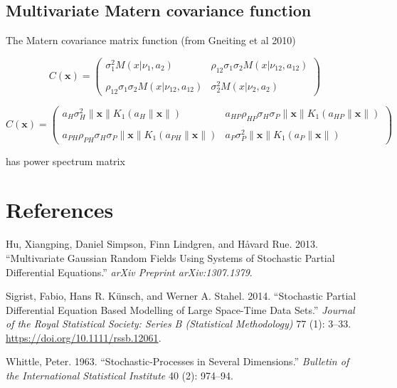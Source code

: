 \documentclass{article}
\begin{document}
\hypertarget{multivariate-matern-covariance-function}{%
\subsection{Multivariate Matern covariance
function}\label{multivariate-matern-covariance-function}}

The Matern covariance matrix function (from Gneiting et al 2010)

\[C(\pmb x)=\left(\begin{matrix}
  \sigma_1^2M(x|\nu_1,a_2) & \rho_{12}\sigma_1\sigma_2M(x|\nu_{12},a_{12}) \\ & \\
  \rho_{12}\sigma_1\sigma_2M(x|\nu_{12},a_{12}) & \sigma_2^2M(x|\nu_2,a_2)
\end{matrix}\right)\]

\[C(\pmb x)=\left(\begin{matrix}
  a_H\sigma_H^2\|\pmb x\|K_1(a_H\|\pmb x\|) & a_{HP}\rho_{HP}\sigma_H\sigma_P\|\pmb x\|K_1(a_{HP}\|\pmb x\|) \\ & \\
  a_{PH}\rho_{PH}\sigma_H\sigma_P\|\pmb x\|K_1(a_{PH}\|\pmb x\|) & a_P\sigma_P^2\|\pmb x\|K_1(a_P\|\pmb x\|)
\end{matrix}\right)\]

has power spectrum matrix

\newpage

\hypertarget{references}{%
\section*{References}\label{references}}

\hypertarget{refs}{}
\leavevmode\hypertarget{ref-hu2013multivariate}{}%
Hu, Xiangping, Daniel Simpson, Finn Lindgren, and Håvard Rue. 2013.
``Multivariate Gaussian Random Fields Using Systems of Stochastic
Partial Differential Equations.'' \emph{arXiv Preprint arXiv:1307.1379}.

\leavevmode\hypertarget{ref-Sigrist2014}{}%
Sigrist, Fabio, Hans R. Künsch, and Werner A. Stahel. 2014. ``Stochastic
Partial Differential Equation Based Modelling of Large Space-Time Data
Sets.'' \emph{Journal of the Royal Statistical Society: Series B
(Statistical Methodology)} 77 (1): 3--33.
\url{https://doi.org/10.1111/rssb.12061}.

\leavevmode\hypertarget{ref-whittle1963stochastic}{}%
Whittle, Peter. 1963. ``Stochastic-Processes in Several Dimensions.''
\emph{Bulletin of the International Statistical Institute} 40 (2):
974--94.



\end{document}
